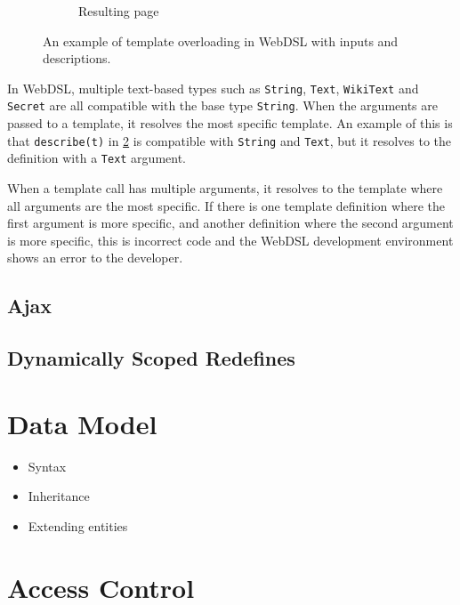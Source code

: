 \begin{figure}
\begin{subfigure}[t]{0.55\textwidth}
          \caption{\label{fig:webdsl-template-overloading-page}Resulting page}
        \end{subfigure}
      \caption{\label{fig:webdsl-template-overloading}An example of template overloading in WebDSL with inputs and descriptions.}
      \end{figure}

      In WebDSL, multiple text-based types such as \texttt{String}, \texttt{Text}, \texttt{WikiText} and \texttt{Secret} are all compatible with the base type \texttt{String}. When the arguments are passed to a template, it resolves the most specific template. An example of this is that \texttt{describe(t)} in \cref{fig:webdsl-template-overloading} is compatible with \texttt{String} and \texttt{Text}, but it resolves to the definition with a \texttt{Text} argument.
      
      When a template call has multiple arguments, it resolves to the template where all arguments are the most specific. If there is one template definition where the first argument is more specific, and another definition where the second argument is more specific, this is incorrect code and the WebDSL development environment shows an error to the developer.

    \subsection{\label{subsec:ajax}Ajax}

    \subsection{\label{subsec:redefines}Dynamically Scoped Redefines}

  \section{\label{sec:data-model}Data Model}

    \begin{itemize}
      \item Syntax
      \item Inheritance
      \item Extending entities
    \end{itemize}

  \section{\label{sec:access-control}Access Control}

